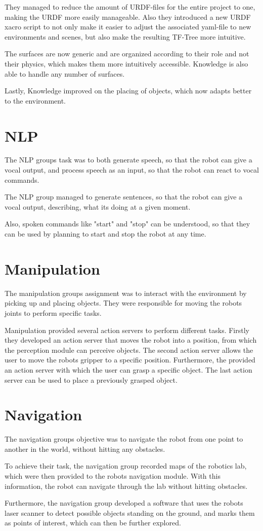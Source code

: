 \documentclass[main.tex]{subfiles}
\begin{document}
		They managed to reduce the amount of URDF-files for the entire project to one, making the URDF more easily manageable.  Also they introduced a new URDF xacro script to not only make it easier to adjust the associated yaml-file to new environments and scenes, but also make the resulting TF-Tree more intuitive.
		
		The surfaces are now generic and are organized according to their role and not their physics, which makes them more intuitively accessible. Knowledge is also able to handle any number of surfaces.
		
		Lastly, Knowledge improved on the placing of objects, which now adapts better to the environment.
		 		
		\section{NLP}
		The NLP groups task was to both generate speech, so that the robot can give a vocal output, and process speech as an input, so that the robot can react to vocal commands.
		
		The NLP group managed to generate sentences, so that the robot can give a vocal output, describing, what its doing at a given moment.
		
		Also, spoken commands like "start" and "stop" can be understood, so that they can be used by planning to start and stop the robot at any time.
		
		\section{Manipulation}
		The manipulation groups assignment was to interact with the environment by picking up and placing objects. They were responsible for moving the robots joints to perform specific tasks.
		
		Manipulation provided several action servers to perform different tasks. Firstly they developed an action server that moves the robot into a position, from which the perception module can perceive objects. The second action server allows the user to move the robots gripper to a specific position. Furthermore, the provided an action server with which the user can grasp a specific object. The last action server can be used to place a previously grasped object.
		
		\section{Navigation}	  	
		The navigation groups objective was to navigate the robot from one point to another in the world, without hitting any obstacles.
		
		To achieve their task, the navigation group recorded maps of the robotics lab, which were then provided to the robots navigation module. With this information, the robot can navigate through the lab without hitting obstacles.
		
		Furthermore, the navigation group developed a software that uses the robots laser scanner to detect possible objects standing on the ground, and marks them as points of interest, which can then be further explored.

		
	\endgroup
\end{document}
